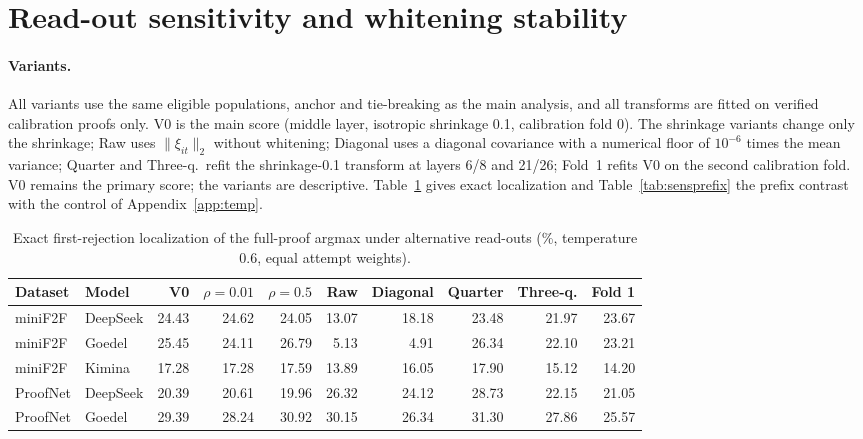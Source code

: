 \section{Read-out sensitivity and whitening stability}\label{app:sensitivity}

\paragraph{Variants.} All variants use the same eligible populations, anchor and tie-breaking as the main analysis, and all transforms are fitted on verified calibration proofs only. V0 is the main score (middle layer, isotropic shrinkage 0.1, calibration fold 0). The shrinkage variants change only the shrinkage; Raw uses $\|\xi_{it}\|_2$ without whitening; Diagonal uses a diagonal covariance with a numerical floor of $10^{-6}$ times the mean variance; Quarter and Three-q.\ refit the shrinkage-0.1 transform at layers 6/8 and 21/26; Fold~1 refits V0 on the second calibration fold. V0 remains the primary score; the variants are descriptive. Table~\ref{tab:sensitivity} gives exact localization and Table~\ref{tab:sensprefix} the prefix contrast with the control of Appendix~\ref{app:temp}.

\begin{table}[h]
\caption{Exact first-rejection localization of the full-proof argmax under alternative read-outs (\%, temperature 0.6, equal attempt weights).}
\label{tab:sensitivity}
\begin{center}
\footnotesize
\setlength{\tabcolsep}{3.5pt}
\begin{tabular}{llrrrrrrrr}
\toprule
Dataset & Model & V0 & $\rho=0.01$ & $\rho=0.5$ & Raw & Diagonal & Quarter & Three-q. & Fold 1\\
\midrule
miniF2F & DeepSeek & 24.43 & 24.62 & 24.05 & 13.07 & 18.18 & 23.48 & 21.97 & 23.67\\
miniF2F & Goedel & 25.45 & 24.11 & 26.79 & 5.13 & 4.91 & 26.34 & 22.10 & 23.21\\
miniF2F & Kimina & 17.28 & 17.28 & 17.59 & 13.89 & 16.05 & 17.90 & 15.12 & 14.20\\
ProofNet & DeepSeek & 20.39 & 20.61 & 19.96 & 26.32 & 24.12 & 28.73 & 22.15 & 21.05\\
ProofNet & Goedel & 29.39 & 28.24 & 30.92 & 30.15 & 26.34 & 31.30 & 27.86 & 25.57\\
\bottomrule
\end{tabular}
\end{center}
\end{table}


